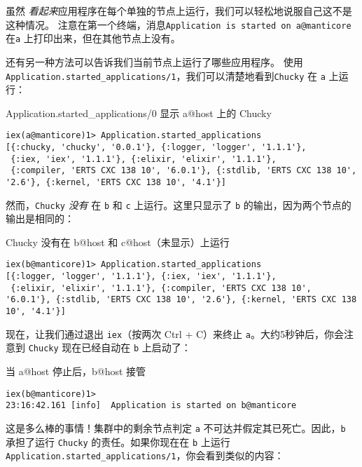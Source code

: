 虽然 \emph{看起来}应用程序在每个单独的节点上运行，我们可以轻松地说服自己这不是这种情况。
注意在第一个终端，消息\texttt{Application is started on a@manticore} 在\texttt{a} 上打印出来，但在其他节点上没有。

还有另一种方法可以告诉我们当前节点上运行了哪些应用程序。
使用\texttt{Application.started\_applications/1}，我们可以清楚地看到\texttt{Chucky} 在 \texttt{a} 上运行：

\begin{code}{Application.started\_applications/0 显示 a@host 上的 Chucky}

\begin{verbatim}
iex(a@manticore)1> Application.started_applications
[{:chucky, 'chucky', '0.0.1'}, {:logger, 'logger', '1.1.1'},
 {:iex, 'iex', '1.1.1'}, {:elixir, 'elixir', '1.1.1'},
 {:compiler, 'ERTS CXC 138 10', '6.0.1'}, {:stdlib, 'ERTS CXC 138 10', '2.6'}, {:kernel, 'ERTS CXC 138 10', '4.1'}]
\end{verbatim}
\end{code}

然而，\texttt{Chucky} \emph{没有} 在
\texttt{b} 和 \texttt{c}
上运行。这里只显示了 \texttt{b}
的输出，因为两个节点的输出是相同的：

\begin{code}{Chucky 没有在 b@host 和 c@host（未显示）上运行}

\begin{verbatim}
iex(b@manticore)1> Application.started_applications
[{:logger, 'logger', '1.1.1'}, {:iex, 'iex', '1.1.1'},
 {:elixir, 'elixir', '1.1.1'}, {:compiler, 'ERTS CXC 138 10', '6.0.1'}, {:stdlib, 'ERTS CXC 138 10', '2.6'}, {:kernel, 'ERTS CXC 138 10', '4.1'}]
\end{verbatim}
\end{code}

现在，让我们通过退出 \texttt{iex}（按两次 Ctrl +
C）来终止 \texttt{a}。大约5秒钟后，你会注意到
\texttt{Chucky} 现在已经自动在
\texttt{b} 上启动了：

\begin{code}{当 a@host 停止后，b@host 接管}

\begin{verbatim}
iex(b@manticore)1>
23:16:42.161 [info]  Application is started on b@manticore
\end{verbatim}
\end{code}

这是多么棒的事情！集群中的剩余节点判定 \texttt{a}
不可达并假定其已死亡。因此，\texttt{b} 承担了运行
\texttt{Chucky} 的责任。如果你现在在
\texttt{b} 上运行
\texttt{Application.started\_applications/1}，你会看到类似的内容：

